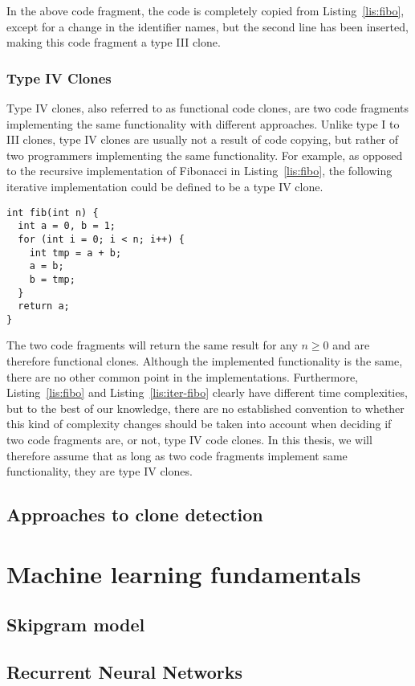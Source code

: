 In the above code fragment, the code is completely copied from
Listing~\ref{lis:fibo}, except for a change in the identifier names, but the
second line has been inserted, making this code fragment a type III clone.
\subsubsection{Type IV Clones}
Type IV clones, also referred to as functional code clones, are two code
fragments implementing the same functionality with different approaches.
Unlike type I to III clones, type IV clones are usually not a result of
code copying, but rather of two programmers implementing the same functionality.
For example, as opposed to the recursive implementation of Fibonacci in
Listing~\ref{lis:fibo}, the following iterative implementation could be defined
to be a type IV clone.
\begin{lstlisting}[caption=Iterative Fibonacci,label=lis:iter-fibo]
int fib(int n) {
  int a = 0, b = 1;
  for (int i = 0; i < n; i++) {
    int tmp = a + b;
    a = b;
    b = tmp;
  }
  return a;
}
\end{lstlisting}
The two code fragments will return the same result for any $n \geq 0$ and are
therefore functional clones. Although the implemented functionality
is the same, there are no other common point in the implementations.
Furthermore, Listing~\ref{lis:fibo} and Listing~\ref{lis:iter-fibo} clearly
have different time complexities, but to the best of our knowledge, there
are no established convention to whether this kind of complexity changes
should be taken into account when deciding if two code fragments are, or not,
type IV code clones. In this thesis, we will therefore assume that as long
as two code fragments implement same functionality, they are type IV clones.
\subsection{Approaches to clone detection}
\section{Machine learning fundamentals}
\subsection{Skipgram model}
\subsection{Recurrent Neural Networks}
